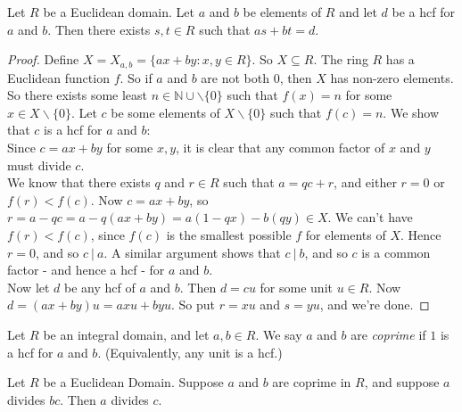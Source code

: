 \documentclass[twoside]{scrartcl}
\begin{document}
 \begin{lemma}   Let $R$ be a Euclidean domain. Let $a$ and $b$ be elements of $R$ and let $d$ be a hcf for $a$ and $b$. Then there exists $s,t\in R$ such that $as + bt = d$.	
 \end{lemma}

 
 \begin{proof}
 	Define $X = X_{a,b} = \{ax + by : x,y \in R\}$. So $X \subseteq R$. The ring $R$ has a Euclidean function $f$. So if $a$ and $b$ are not both $0$, then $X$ has non-zero elements. So there exists some least $n \in \mathbb{N}\cup\backslash\{0\}$ such that $f(x) = n$ for some $x \in X\backslash\{0\}.$ Let $c$ be some elements of $X \backslash\{0\}$ such that $f(c) = n$. We show that $c$ is a hcf for $a$ and $b$:\\
 	
 	Since $c = ax + by$ for some $x,y$, it is clear that any common factor of $x$ and $y$ must divide $c$.\\
 	
 	We know that there exists $q$ and $r\in R$ such that $a = qc + r$, and either $ r = 0$ or $f(r) < f(c)$. Now $c = ax + by$, so $r = a -qc = a - q(ax + by) = a(1-qx) -b(qy) \in X$. We can't have $f(r) < f(c)$, since $f(c)$ is the smallest possible $f$ for elements of $X$. Hence $r = 0$, and so $c~|~ a$. A similar argument shows that $c ~|~ b$, and so $c$ is a common factor - and hence a hcf - for $a$ and $b$.\\
 	
 	Now let $d$ be any hcf of $a$ and $b$. Then $d =  cu$ for some unit $u \in R$. Now $d = (ax + by)u = axu + byu$. So put $r = xu$ and $s = yu$, and we're done.
 \end{proof}\vspace*{5pt}

 
 \vspace*{5pt}
 
\begin{definition}Let $R$ be an integral domain, and let $a,b \in R$. We say $a$ and $b$ are \emph{coprime}  if $1$ is a hcf for $a$ and $b$. (Equivalently, any unit is a hcf.)	
\end{definition}\vspace*{5pt}
 
 \begin{proposition} Let $R$ be a Euclidean Domain. Suppose $a$ and $b$ are coprime in $R$, and suppose $a$ divides $bc$. Then $a$ divides $c$.
\end{proposition}
\end{document}
